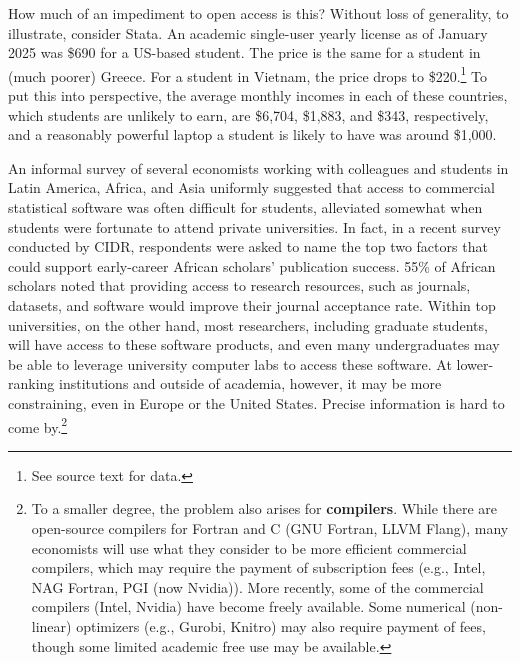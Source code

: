 \documentclass{article}
\begin{document}
How much of an impediment to open access is this? Without loss of generality, to illustrate, consider Stata. An academic single-user yearly license as of January 2025 was \$690 for a US-based student. The price is the same for a student in (much poorer) Greece. For a student in Vietnam, the price drops to \$220.\footnote{See source text for data.}  To put this into perspective, the average monthly incomes in each of these countries, which students are unlikely to earn, are \$6,704, \$1,883, and \$343, respectively, and a reasonably powerful laptop a student is likely to have was around \$1,000. 




An informal survey of several economists working with colleagues and students in Latin America, Africa, and Asia uniformly suggested that access to commercial statistical software was often difficult for students, alleviated somewhat when students were fortunate to attend private universities. In fact, in a recent survey conducted by CIDR, respondents were asked to name the top two factors that could support early-career African scholars’ publication success. 
55\% of African scholars noted that providing access to research resources, such as journals, datasets, and software would improve their journal acceptance rate.%
%
Within top universities, on the other hand, most researchers, including graduate students, will have access to these software products, and even many undergraduates may be able to leverage university computer labs to access these software. At lower-ranking institutions and outside of academia, however, it may be more constraining, even in Europe or the United States. Precise information is hard to come by.\footnote{To a smaller degree, the problem also arises for \textbf{compilers}. While there are open-source compilers for Fortran and C (GNU Fortran, LLVM Flang), many economists will use what they consider to be more efficient commercial compilers, which may require the payment of  subscription fees (e.g., Intel, NAG Fortran, PGI (now Nvidia)). More recently, some of the commercial compilers (Intel, Nvidia) have become freely available. Some numerical (non-linear) optimizers (e.g., Gurobi, Knitro) may also require payment of fees, though some limited academic free use may be available.}
%
\end{document}
